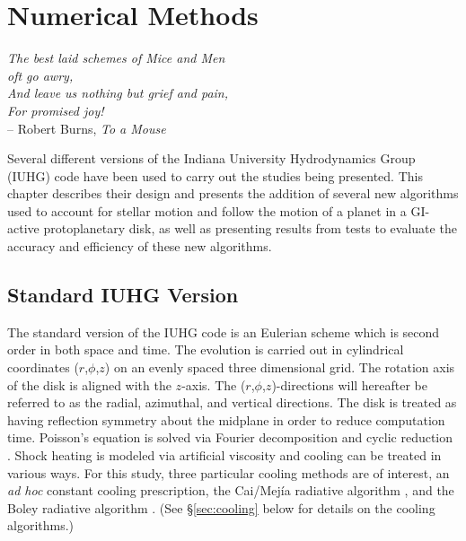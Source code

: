 \chapter{Numerical Methods}\label{chap:numeth}
\thispagestyle{plain}
\begin{spacing}{0.9}
\begin{flushright}
{\it \footnotesize The best laid schemes of Mice and Men\\ oft go awry,\\ And leave us nothing but grief and pain,\\ For promised joy!\\}
 {\small -- Robert Burns, {\it To a Mouse}}
\end{flushright}
\end{spacing}
Several different versions of the Indiana University Hydrodynamics Group (IUHG) code have been used to carry out the studies being presented. This chapter describes their design and presents the addition of several new algorithms used to account for stellar motion and follow the motion of a planet in a GI-active protoplanetary disk, as well as presenting results from tests to evaluate the accuracy and efficiency of these new algorithms. 

\section{Standard IUHG Version}\label{sec:standard}

The standard version of the IUHG code is an Eulerian scheme which is second order in both space and time. The evolution is carried out in cylindrical coordinates ($r$,$\phi$,$z$) on an evenly spaced three dimensional grid. The rotation axis of the disk is aligned with the $z$-axis. The ($r$,$\phi$,$z$)-directions will hereafter be referred to as the radial, azimuthal, and vertical directions. The disk is treated as having reflection symmetry about the midplane in order to reduce computation time.
Poisson's equation is solved via Fourier decomposition and cyclic reduction \citep{tohline1980}. Shock heating is modeled via artificial viscosity \citep{pickettphd1995} and cooling can be treated in various ways. For this study, three particular cooling methods are of interest, an {\it ad hoc} constant cooling prescription, the Cai/Mej\'{i}a radiative algorithm \citep{mejiaphd2004,caiphd2006}, and the Boley radiative algorithm \citep{boley2007b}. (See \S \ref{sec:cooling} below for details on the cooling algorithms.)

